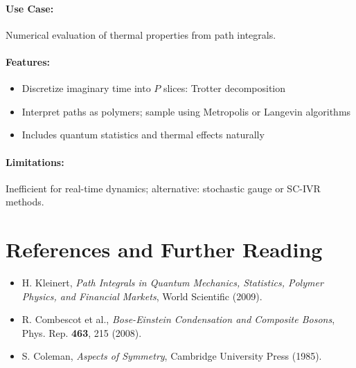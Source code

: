 \paragraph{Use Case:} Numerical evaluation of thermal properties from path integrals.
\paragraph{Features:}
\begin{itemize}
  \item Discretize imaginary time into \(P\) slices: Trotter decomposition
  \item Interpret paths as polymers; sample using Metropolis or Langevin algorithms
  \item Includes quantum statistics and thermal effects naturally
\end{itemize}

\paragraph{Limitations:} Inefficient for real-time dynamics; alternative: stochastic gauge or SC-IVR methods.

\section*{References and Further Reading}
\begin{itemize}
  \item H. Kleinert, \emph{Path Integrals in Quantum Mechanics, Statistics, Polymer Physics, and Financial Markets}, World Scientific (2009).
  \item R. Combescot et al., \emph{Bose-Einstein Condensation and Composite Bosons}, Phys. Rep. \textbf{463}, 215 (2008).
  \item S. Coleman, \emph{Aspects of Symmetry}, Cambridge University Press (1985).
\end{itemize}

